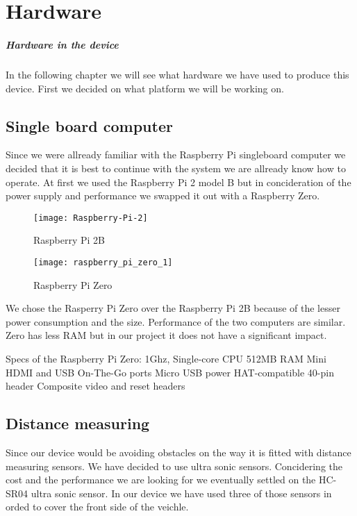 \chapter{Hardware}\label{ch:hardware}

\paragraph{Hardware in the device} 



In the following chapter we will see what hardware we have used to produce this device.
First we decided on what platform we will be working on.

\section{Single board computer} 

Since we were allready familiar with the Raspberry Pi singleboard computer we decided that it is best to continue with the system we are allready know how to operate.
At first we used the Raspberry Pi 2 model B but in concideration of the power supply and performance we swapped it out with a Raspberry Zero.


\begin{figure}[h]
\centering
\texttt{[image: Raspberry-Pi-2]}
\caption{Raspberry Pi 2B}
\label{fig::rasppi2b}
\end{figure}

\begin{figure}[h]
\centering
\texttt{[image: raspberry\_pi\_zero\_1]}
\caption{Raspberry Pi Zero}
\label{fig::raspizero}
\end{figure}


We chose the Rasperry Pi Zero over the Raspberry Pi 2B because of the lesser power consumption and the size.
Performance of the two computers are similar. 
Zero has less RAM but in our project it does not have a significant impact.

Specs of the Raspberry Pi Zero:
1Ghz, Single-core CPU
512MB RAM
Mini HDMI and USB On-The-Go ports
Micro USB power
HAT-compatible 40-pin header
Composite video and reset headers



\section{Distance measuring} 

Since our device would be avoiding obstacles on the way it is fitted with distance measuring sensors.
We have decided to use ultra sonic sensors.
Concidering the cost and the performance we are looking for we eventually settled on the HC-SR04 ultra sonic sensor.
In our device we have used three of those sensors in orded to cover the front side of the veichle.

